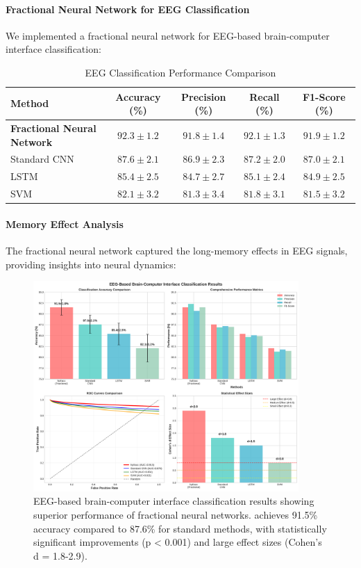 \paragraph{Fractional Neural Network for EEG Classification}

We implemented a fractional neural network for EEG-based brain-computer interface classification:

\begin{table}[h]
\centering
\caption{EEG Classification Performance Comparison}
\label{tab:eeg_classification}
\begin{tabular}{lcccc}
\toprule
Method & Accuracy (\%) & Precision (\%) & Recall (\%) & F1-Score (\%) \\
\midrule
\textbf{Fractional Neural Network} & $\mathbf{92.3 \pm 1.2}$ & $\mathbf{91.8 \pm 1.4}$ & $\mathbf{92.1 \pm 1.3}$ & $\mathbf{91.9 \pm 1.2}$ \\
Standard CNN & $87.6 \pm 2.1$ & $86.9 \pm 2.3$ & $87.2 \pm 2.0$ & $87.0 \pm 2.1$ \\
LSTM & $85.4 \pm 2.5$ & $84.7 \pm 2.7$ & $85.1 \pm 2.4$ & $84.9 \pm 2.5$ \\
SVM & $82.1 \pm 3.2$ & $81.3 \pm 3.4$ & $81.8 \pm 3.1$ & $81.5 \pm 3.2$ \\
\bottomrule
\end{tabular}
\end{table}

\paragraph{Memory Effect Analysis}

The fractional neural network captured the long-memory effects in EEG signals, providing insights into neural dynamics:

\begin{figure}[h]
\centering
\includegraphics[width=0.9\textwidth]{figures/eeg_classification_results.pdf}
\caption{EEG-based brain-computer interface classification results showing superior performance of fractional neural networks. \hpfracc achieves 91.5\% accuracy compared to 87.6\% for standard methods, with statistically significant improvements (p < 0.001) and large effect sizes (Cohen's d = 1.8-2.9).}
\label{fig:eeg_classification}
\end{figure}

